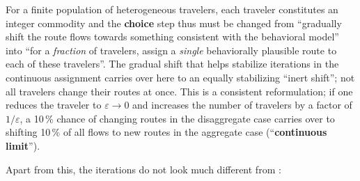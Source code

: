 
%

For a finite population of heterogeneous travelers, each
traveler constitutes an integer commodity and the \textbf{choice}
step thus must be changed from ``gradually shift the route flows
towards something consistent with the behavioral model'' into
``for a \emph{fraction} of travelers, assign a \emph{single}
behaviorally plausible route to each of these travelers''. The gradual shift that
helps stabilize iterations in the continuous assignment carries
over here to an equally stabilizing ``inert shift''; not all travelers
change their routes at once. This is a consistent reformulation; if
one reduces the traveler  to $\varepsilon
\rightarrow 0$ and increases the number of travelers by a factor of $1/\varepsilon$,
a 10\,\% chance of
changing routes in the disaggregate case carries over to shifting 10\,\%
of all flows to new routes in the aggregate case (``\textbf{continuous
limit}'').

Apart from this, the iterations do not look much different from 
:

